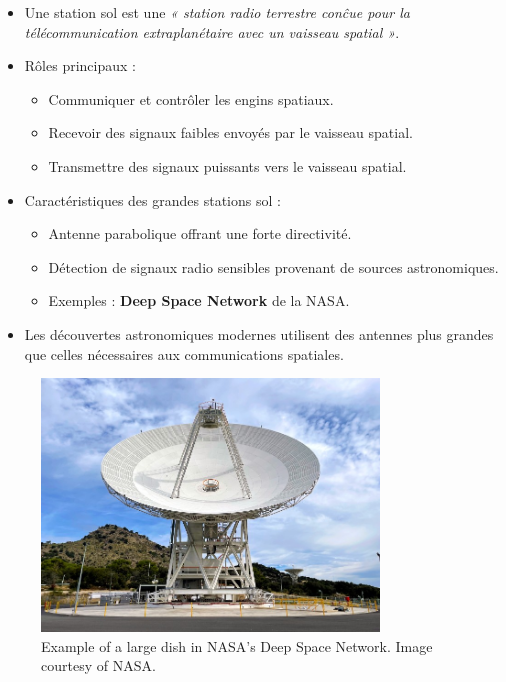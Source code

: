 \begin{itemize}
    \item Une station sol est une \textit{« station radio terrestre con\^cue pour la t\'el\'ecommunication extraplan\'etaire avec un vaisseau spatial »}.
    \item R\^oles principaux :
    \begin{itemize}
        \item Communiquer et contr\^oler les engins spatiaux.  
        \item Recevoir des signaux faibles envoy\'es par le vaisseau spatial.  
        \item Transmettre des signaux puissants vers le vaisseau spatial.  
    \end{itemize}
    \item Caract\'eristiques des grandes stations sol :
    \begin{itemize}
        \item Antenne parabolique offrant une forte directivit\'e.  
        \item D\'etection de signaux radio sensibles provenant de sources astronomiques.  
        \item Exemples : \textbf{Deep Space Network} de la NASA.  
    \end{itemize}
    \item Les d\'ecouvertes astronomiques modernes utilisent des antennes plus grandes que celles n\'ecessaires aux communications spatiales.  
\end{itemize}
\begin{figure}[H] %
    \centering
    \includegraphics[width=0.8\textwidth]{figures/3.8-1.jpg}
    \caption{Example of a large dish in NASA’s Deep Space Network. Image courtesy of NASA.}
    \label{fig:communication2}
\end{figure}
